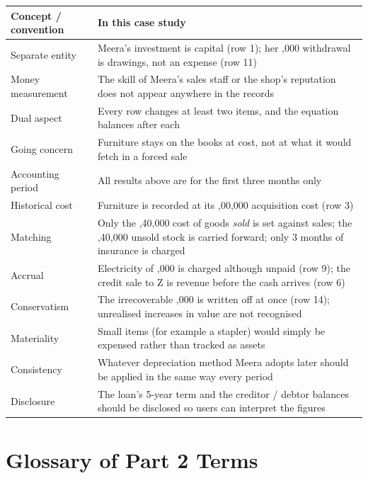 \documentclass[11pt,a4paper]{article}
\newcommand{\Rs}{\ifmmode\text{\rsfont ₹}\else{\rsfont ₹}\fi}
\begin{document}
\begin{center}
\small
\begin{tabularx}{\textwidth}{@{}l Y@{}}
\toprule
{}\textbf{Concept / convention} & \textbf{In this case study}\\
\midrule
Separate entity & Meera's investment is capital (row 1); her \Rs 25,000 withdrawal is drawings, not an expense (row 11)\\
Money measurement & The skill of Meera's sales staff or the shop's reputation does not appear anywhere in the records\\
Dual aspect & Every row changes at least two items, and the equation balances after each\\
Going concern & Furniture stays on the books at cost, not at what it would fetch in a forced sale\\
Accounting period & All results above are for the first three months only\\
Historical cost & Furniture is recorded at its \Rs 2,00,000 acquisition cost (row 3)\\
Matching & Only the \Rs 2,40,000 cost of goods \emph{sold} is set against sales; the \Rs 1,40,000 unsold stock is carried forward; only 3 months of insurance is charged\\
Accrual & Electricity of \Rs 10,000 is charged although unpaid (row 9); the credit sale to Z is revenue before the cash arrives (row 6)\\
Conservatism & The irrecoverable \Rs 10,000 is written off at once (row 14); unrealised increases in value are not recognised\\
Materiality & Small items (for example a stapler) would simply be expensed rather than tracked as assets\\
Consistency & Whatever depreciation method Meera adopts later should be applied in the same way every period\\
Disclosure & The loan's 5-year term and the creditor / debtor balances should be disclosed so users can interpret the figures\\
\bottomrule
\end{tabularx}
\end{center}

\section{Glossary of Part 2 Terms}
\end{document}
